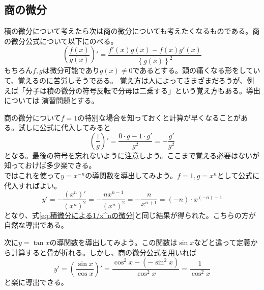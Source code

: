 \documentclass[a4j,dvipdfmx]{jsarticle}
\begin{document}
            \subsection{商の微分}
                積の微分について考えたら次は商の微分についても考えたくなるものである。商の微分公式について以下にのべる。
                \begin{equation}
                    \left(\frac{f(x)}{g(x)}\right)'=\frac{f'(x)g(x)-f(x)g'(x)}{\left\{g(x)\right\}^2}\label{eq:商の微分公式}
                \end{equation}
                もちろん$f,g$は微分可能であり$g(x)\neq 0$であるとする。頭の痛くなる形をしていて、覚えるのに苦労しそうである。
                覚え方は人によってさまざまだろうが、例えば「分子は積の微分の符号反転で分母は二乗する」という覚え方もある。導出については
                演習問題とする。

                商の微分について$f=1$の特別な場合を知っておくと計算が早くなることがある。試しに公式に代入してみると
                \begin{equation}
                    \left(\frac{1}{g}\right)'=\frac{0\cdot g-1\cdot g'}{g^2}=-\frac{g'}{g^2}
                \end{equation}
                となる。最後の符号を忘れないように注意しよう。ここまで覚える必要はないが知っておけば多少楽できる。\\

                ではこれを使って$y=x^{-n}$の導関数を導出してみよう。$f=1,g=x^n$として公式に代入すればよい。
                \begin{equation}
                    y'=-\frac{(x^n)'}{(x^n)^2}=-\frac{nx^{n-1}}{(x^n)^2}=-\frac{n}{x^{n+1}}=(-n)\cdot x^{(-n)-1}
                \end{equation}
                となり、式\ref{eq:積微分による1/x^nの微分}と同じ結果が得られた。こちらの方が自然な導出である。

                次に$y=\tan x$の導関数を導出してみよう。この関数は$\sin x$などと違って定義から計算すると骨が折れる。しかし、商の微分公式を用いれば
                \begin{equation}
                    y'=\left(\frac{\sin x}{\cos x}\right)'=\frac{\cos^2 x-(-\sin^2 x)}{\cos^2 x}=\frac{1}{\cos^2 x}
                \end{equation}
                と楽に導出できる。
            \clearpage
\end{document}
